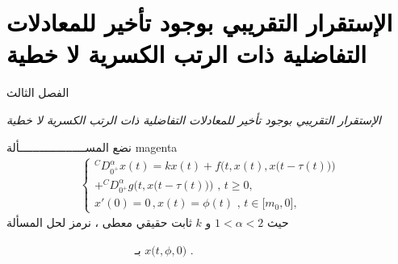 \documentclass[dvipsnames,mathserif]{beamer}
\begin{document}
\section{\textcolor{black}{ الإستقرار التقريبي بوجود تأخير للمعادلات التفاضلية ذات الرتب الكسرية لا خطية }}
\begin{frame}[containsverbatim]{الفصل الثالث  }\transsplithorizontalout[duration=0.5]

\begin{tcolorbox}[colback=white,drop large lifted shadow,top=.5cm,bottom=.5cm]
{\begin{center}
	{\Huge\ttfamily\emph{{ الإستقرار التقريبي بوجود تأخير للمعادلات التفاضلية ذات الرتب الكسرية لا خطية}}}
	\end{center}}
\end{tcolorbox}
\end{frame}
\begin{frame}
\begin{ambox}{نضع المســــــــــــــــــــألة }{magenta}
\begin{align}
\begin{cases}
{}^CD_{{0^ + }}^\alpha x(t) = kx(t) + f\big(t,x(t),x\big(t - \tau (t)\big)\big)\\
 + {}^CD_{{0^ + }}^\alpha g\big(t,x\big(t - \tau (t)\big)\big)\,\,,\,t \ge 0,\\
x'(0) = 0\,,x(t) = \phi (t)\,\,,\,t \in \big[ {{m_0},0} \big],
\end{cases}
\end{align}
حيث 
$1 < \alpha  < 2$
و $k$ ثابت حقيقي معطى ،
 نرمز لحل  المسألة 

~~~~~~~~~~~~~~~~~~~~~~
 بـ
 $x\big(t,\phi,0\big)$
 .
 \end{ambox}
\end{frame}
\end{document}
